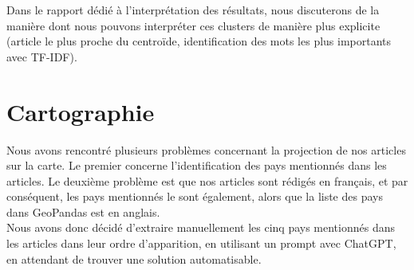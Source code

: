 \documentclass{article}
\begin{document}
Dans le rapport dédié à l'interprétation des résultats, nous discuterons de la manière dont nous pouvons interpréter ces clusters de manière plus explicite (article le plus proche du centroïde, identification des mots les plus importants avec TF-IDF).

\section{Cartographie}

Nous avons rencontré plusieurs problèmes concernant la projection de nos articles sur la carte. Le premier concerne l'identification des pays mentionnés dans les articles. Le deuxième problème est que nos articles sont rédigés en français, et par conséquent, les pays mentionnés le sont également, alors que la liste des pays dans GeoPandas est en anglais. \\

Nous avons donc décidé d'extraire manuellement les cinq pays mentionnés dans les articles dans leur ordre d'apparition, en utilisant un prompt avec ChatGPT, en attendant de trouver une solution automatisable. 
\end{document}
